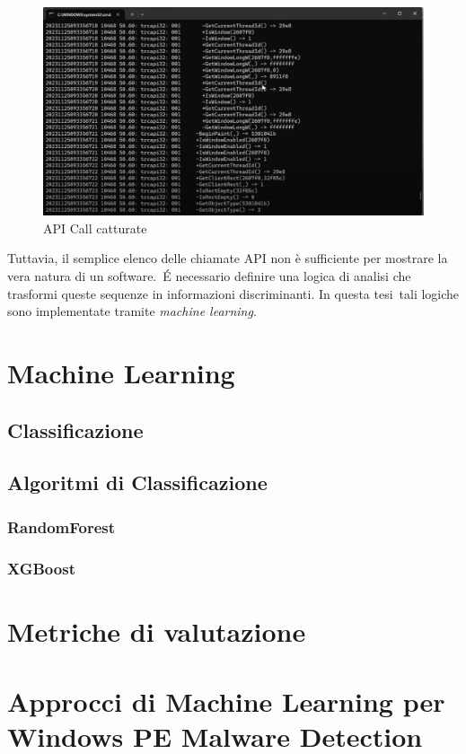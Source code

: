 \begin{figure}[htbp]
    \centering
    \includegraphics[width=1\textwidth]{./stato-dell-arte/imgs/api_call_example.png}
    \caption{API Call catturate}
    \label{fig:api_call_example}
\end{figure}

Tuttavia, il semplice elenco delle chiamate API non è sufficiente per mostrare la vera natura di un software.\
É necessario definire una logica di analisi che trasformi queste sequenze in informazioni discriminanti. In questa tesi\
tali logiche sono implementate tramite \textit{machine learning}.

\section{Machine Learning}

\subsection{Classificazione}

\subsection{Algoritmi di Classificazione}

\subsubsection{RandomForest}

\subsubsection{XGBoost}

\section{Metriche di valutazione}

\section{Approcci di Machine Learning per Windows PE Malware Detection}
